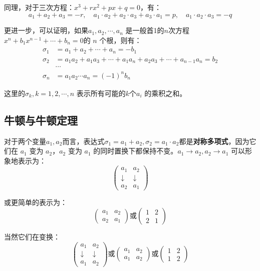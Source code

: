 \documentclass[12pt]{article}
\begin{document}
同理，对于三次方程：$x^3 + rx^2 + px + q = 0$，有：
$$
a_1 + a_2 + a_3 = -r, \quad a_1\cdot a_2 + a_2\cdot a_3 + a_3 \cdot a_1 = p, \quad a_1\cdot a_2 \cdot a_3 = -q
$$

更进一步，可以证明，如果$a_1, a_2, \cdots, a_n$ 是一般首1的$n$次方程 $x^n + b_1x^{n-1} + \cdots + b_n = 0$的 $n$ 个根，则有：
\begin{align*}
\sigma_1 &= a_1 + a_2 + \cdots + a_n = -b_1  \\
\sigma_2 &= a_1a_2 + a_1a_3 + \cdots + a_1a_n + a_2a_3 + \cdots + a_{n-1}a_n = b_2 \\
& \cdots \\
\sigma_n &= a_1a_2\cdots a_n = (-1)^nb_n
\end{align*}

这里的$\sigma_k, k = 1, 2, \cdots, n$ 表示所有可能的$k$个$a_i$ 的乘积之和。

\subsection{牛顿与牛顿定理}
对于两个变量$a_1,a_2$而言，表达式$\sigma_1 = a_1 + a_2, \sigma_2 = a_1 \cdot a_2$都是\textbf{对称多项式}，因为它们在 $a_1$ 变为 $a_2$，$a_2$ 变为 $a_1$ 的同时置换下都保持不变。$a_1 \rightarrow a_2, a_2 \rightarrow a_1$ 可以形象地表示为：
$$
\begin{pmatrix}
a_1 & a_2 \\
\downarrow & \downarrow \\
a_2 & a_1
\end{pmatrix}
$$

或更简单的表示为：
$$
\begin{pmatrix}
a_1 & a_2 \\
a_2 & a_1
\end{pmatrix}
\text{或}
\begin{pmatrix}
1 & 2 \\
2 & 1
\end{pmatrix}
$$

当然它们在变换：
$$
\begin{pmatrix}
a_1 & a_2 \\
\downarrow & \downarrow \\
a_1 & a_2
\end{pmatrix}
\text{或}
\begin{pmatrix}
a_1 & a_2 \\
a_1 & a_2
\end{pmatrix}
\text{或}
\begin{pmatrix}
1 & 2 \\
1 & 2
\end{pmatrix}
$$
\end{document}
